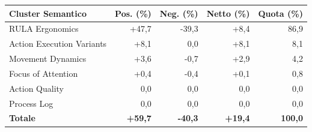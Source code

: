 \begin{tabular*}{\linewidth}{@{}l@{\extracolsep{\fill}}rrrr@{}}
\toprule
\textbf{Cluster Semantico} & \textbf{Pos. (\%)} & \textbf{Neg. (\%)} & \textbf{Netto (\%)} & \textbf{Quota (\%)} \\
\midrule
RULA Ergonomics & +47{,}7 & -39{,}3 & +8{,}4 & 86{,}9 \\
Action Execution Variants & +8{,}1 & 0{,}0 & +8{,}1 & 8{,}1 \\
Movement Dynamics & +3{,}6 & -0{,}7 & +2{,}9 & 4{,}2 \\
Focus of Attention & +0{,}4 & -0{,}4 & +0{,}1 & 0{,}8 \\
Action Quality & 0{,}0 & 0{,}0 & 0{,}0 & 0{,}0 \\
Process Log & 0{,}0 & 0{,}0 & 0{,}0 & 0{,}0 \\
\midrule
\textbf{Totale} & \textbf{+59{,}7} & \textbf{-40{,}3} & \textbf{+19{,}4} & \textbf{100{,}0} \\
\bottomrule
\end{tabular*}
